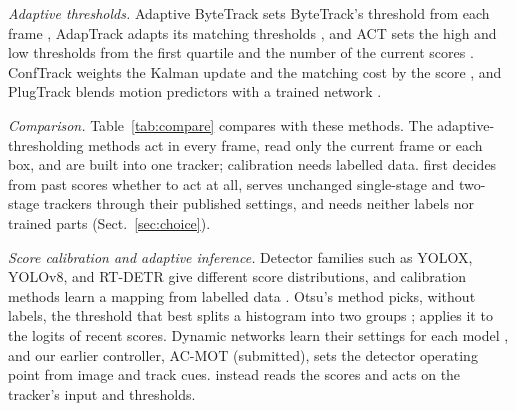 \emph{Adaptive thresholds.} Adaptive ByteTrack sets ByteTrack's threshold from each frame
\cite{ma2023adaptivebytetrack}, AdapTrack adapts its matching thresholds \cite{shim2024adaptrack},
and ACT sets the high and low thresholds from the first quartile and the number of the current
scores \cite{act2026adaptive}. ConfTrack weights the Kalman update and the matching cost by the
score \cite{jung2024conftrack}, and PlugTrack blends motion predictors with a trained network
\cite{kim2026plugtrack}.

\emph{Comparison.} Table~\ref{tab:compare} compares \scl{} with these methods. The
adaptive-thresholding methods act in every frame, read only the current frame or each box, and are
built into one tracker; calibration needs labelled data. \scl{} first decides from past scores
whether to act at all, serves unchanged single-stage and two-stage trackers through their published
settings, and needs neither labels nor trained parts (Sect.~\ref{sec:choice}).




\emph{Score calibration and adaptive inference.} Detector families such as YOLOX, YOLOv8, and
RT-DETR give different score distributions, and calibration methods learn a mapping from labelled
data \cite{kuppers2020detcalib}. Otsu's method picks, without labels, the threshold that best splits a
histogram into two groups \cite{goh2018otsu}; \scl{} applies it to the logits of recent scores. Dynamic
networks learn their settings for each model \cite{han2022dynamic}, and our earlier controller,
AC-MOT (submitted), sets the detector operating point from image and track cues. \scl{} instead
reads the scores and acts on the tracker's input and thresholds.
